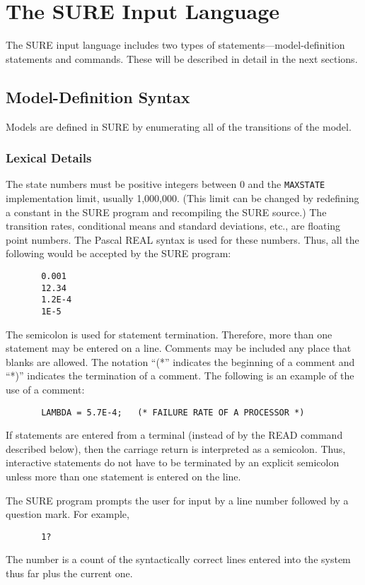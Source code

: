 \section{The SURE Input Language }

The SURE input language includes two types of statements---model-definition
statements and commands.  These will be described in detail in the next
sections.

\subsection{Model-Definition Syntax }



Models are defined in SURE by enumerating all of the transitions of the model.  

\subsubsection{Lexical Details} The state numbers must be positive
integers between 0 and the \verb|MAXSTATE| implementation limit, usually
1,000,000. (This limit can be changed by redefining a constant in the SURE
program and recompiling the SURE source.)  The transition rates, conditional
means and standard deviations, etc., are floating point numbers.  The Pascal
REAL syntax is used for these numbers.  Thus, all the following would be
accepted by the SURE program:
\begin{verbatim}
       0.001
       12.34
       1.2E-4
       1E-5
\end{verbatim}

The semicolon is used for statement termination.  Therefore, more than one
statement may be entered on a line.  Comments may be included any place that
blanks are allowed.  The notation ``(*'' indicates the beginning of a comment
and ``*)'' indicates the termination of a comment.  The following is an example
of the use of a comment:
\begin{verbatim}
       LAMBDA = 5.7E-4;   (* FAILURE RATE OF A PROCESSOR *)
\end{verbatim}
If statements are entered from a terminal (instead of by the {\isf READ} command
described below), then the carriage return is interpreted as a semicolon.
Thus, interactive statements do not have to be terminated by an explicit
semicolon unless more than one statement is entered on the line.

        The SURE program prompts the user for input by a line number followed
        by a question mark.  For example,
\begin{verbatim}
       1?
\end{verbatim}
The number is a count of the syntactically correct lines entered into the
system thus far plus the current one.

